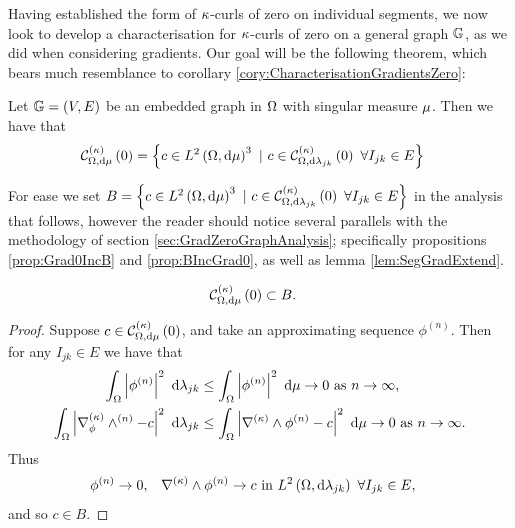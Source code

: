 Having established the form of $\kappa$-curls of zero on individual segments, we now look to develop a characterisation for $\kappa$-curls of zero on a general graph $\mathbb{G}$, as we did when considering gradients.
Our goal will be the following theorem, which bears much resemblance to corollary \ref{cory:CharacterisationGradientsZero}:
\begin{theorem} \label{thm:kCurlZeroGraphChar}
	Let $\mathbb{G}=\left( V,E \right)$ be an embedded graph in $\Omega$ with singular measure $\mu$.
	Then we have that
	\begin{align*}
		\mathcal{C}_{ \Omega, \mathrm{d}\mu}^{(\kappa)}\left( 0 \right) &= \left\{  c\in L^{2}\left( \Omega,\mathrm{d}\mu \right)^3 \ \vert \ c\in\mathcal{C}_{ \Omega, \mathrm{d}\lambda_{jk}}^{(\kappa)}\left( 0 \right) \ \forall I_{jk}\in E \right\}
	\end{align*}
\end{theorem}
For ease we set $B = \left\{  c\in L^{2}\left( \Omega,\mathrm{d}\mu \right)^3 \ \vert \ c\in\mathcal{C}_{ \Omega, \mathrm{d}\lambda_{jk}}^{(\kappa)}\left( 0 \right) \ \forall I_{jk}\in E \right\}$ in the analysis that follows, however the reader should notice several parallels with the methodology of section \ref{sec:GradZeroGraphAnalysis}; specifically propositions \ref{prop:Grad0IncB} and \ref{prop:BIncGrad0}, as well as lemma \ref{lem:SegGradExtend}.
\begin{lemma} \label{lem:kCurlZeroInB}
	\begin{align*}
		\mathcal{C}_{ \Omega, \mathrm{d}\mu}^{(\kappa)}\left( 0 \right) &\subset B.
	\end{align*}
\end{lemma}
\begin{proof}
	Suppose $c\in\mathcal{C}_{ \Omega, \mathrm{d}\mu}^{(\kappa)}\left( 0 \right)$, and take an approximating sequence $\phi^{(n)}$.
	Then for any $I_{jk}\in E$ we have that
	\begin{align*}
		\int_{\Omega}\left\lvert \phi^{(n)} \right\rvert^2 \ \mathrm{d}\lambda_{jk} 
		&\leq \int_{\Omega}\left\lvert \phi^{(n)} \right\rvert^2 \ \mathrm{d}\mu \rightarrow 0 \ \text{as} \ n \rightarrow\infty, \\
		\int_{\Omega}\left\lvert \nabla_{\phi}^{(\kappa)}\wedge^{(n)} - c \right\rvert^2 \ \mathrm{d}\lambda_{jk}
		&\leq \int_{\Omega}\left\lvert \nabla_{}^{(\kappa)}\wedge\phi^{(n)} - c \right\rvert^2 \ \mathrm{d}\mu \rightarrow 0 \ \text{as} \ n \rightarrow\infty.
	\end{align*}
	Thus
	\begin{align*}
		\phi^{(n)}\rightarrow 0, &\quad \kcurl{}\phi^{(n)}\rightarrow c \text{ in } \ltwo{\ddom}{\lambda_{jk}} \ \forall I_{jk}\in E,
	\end{align*}
	and so $c\in B$.
\end{proof}

